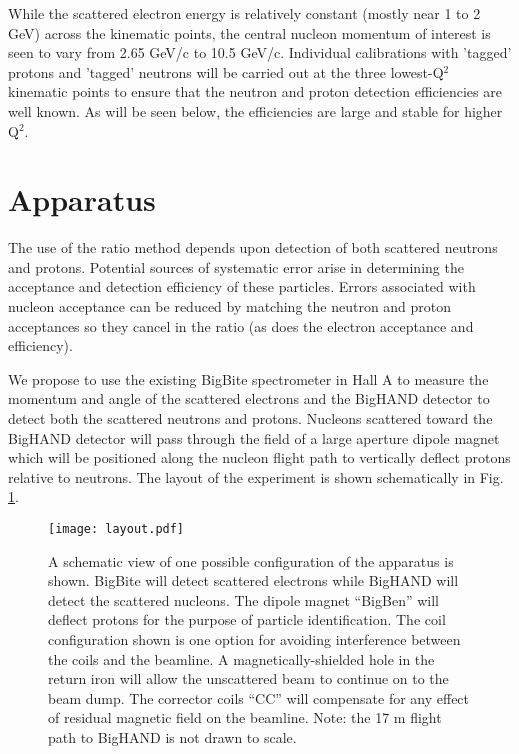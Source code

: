 \documentclass[12pt,letterpaper,oneside]{article}
\begin{document}
While the scattered electron energy is relatively constant (mostly near 1 to 2
GeV) across the kinematic points, the central nucleon momentum of
interest is seen to vary from 2.65 GeV/c to 10.5 GeV/c.  Individual
calibrations with 'tagged' protons and 'tagged' neutrons will be 
carried out at the three lowest-Q$^2$ kinematic points to ensure that
the neutron and proton detection efficiencies are well known.  As will
be seen below, the efficiencies are large and stable for higher Q$^2$.

\section{Apparatus}
The use of the ratio method depends upon detection of both scattered
neutrons and protons.  Potential sources of systematic error arise in
determining the acceptance and detection efficiency of these particles.
  Errors associated
with nucleon acceptance can be reduced by matching the neutron and
proton acceptances so they cancel in the ratio (as does the electron
acceptance and efficiency). 

We propose to use the existing BigBite spectrometer in Hall A to
measure the momentum and angle of the scattered electrons and the 
BigHAND detector  to detect both the scattered neutrons
and protons.  Nucleons scattered toward the BigHAND detector
will pass through the field of a large aperture dipole magnet which
will be positioned  along the nucleon flight path to vertically deflect protons
relative to neutrons.  The layout of the experiment is shown
schematically in Fig. \ref{layout}.


\begin{figure}
\texttt{[image: layout.pdf]}\\
\caption{\label{layout}
A schematic view of one possible configuration of the 
apparatus is shown. BigBite will detect
scattered electrons while BigHAND will detect the scattered nucleons.
The dipole magnet ``BigBen'' will deflect protons for the purpose of
particle identification.  The coil configuration shown is one option
for avoiding interference between the coils and the beamline.  A
magnetically-shielded hole in the return iron will allow the
unscattered beam to continue on to the beam dump.  
The corrector coils ``CC'' will compensate
for any effect of residual magnetic field on the beamline.  
Note: the 17 m flight path to BigHAND 
is not drawn to scale.
}
\end{figure}
\end{document}
